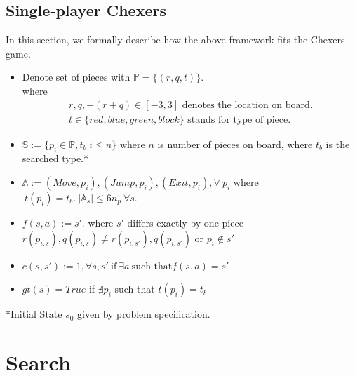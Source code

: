 \documentclass[10.5pt,a4paper]{article}
\begin{document}
    \subsection{Single-player Chexers}
    In this section, we formally describe how the above framework fits the Chexers game.
    \begin{itemize}
        \itemsep0em
        \item Denote set of pieces with $\mathbb{P}=\{(r, q, t)\}$. \\
        where
        \begin{align*}
            \text{$r, q, -(r+q)\in [-3, 3]$ denotes the location on board.}\\
            \text{$t\in \{red, blue, green, block\}$ stands for type of piece.}    
        \end{align*}
        
        \item $\mathbb{S} := \{p_i\in \mathbb{P}, t_b|i\le n\}$ where $n$ is number of pieces on board, where $t_b$ is the searched type.*
        \item $\mathbb{A} := (Move,p_i), (Jump, p_i), (Exit, p_i), \forall\ p_i $ where$\ t(p_i)=t_b.\ | \mathbb{A}_s| \le 6n_p\ \forall s$.
        \item $f(s, a) := s'$. where $s'$ differs exactly by one piece $r(p_{i,s}), q(p_{i,s}) \ne r(p_{i,s'}), q(p_{i,s'})$ or $p_i\notin s'$
        \item $c(s, s') := 1, \forall s, s'\ \text{if}\ \exists a\ \text{such that} f(s, a) = s'$
        \item $gt(s) = True$ if $\nexists p_i$ such that $t(p_i) = t_b$
    \end{itemize}
    \vspace{-5pt}
    *Initial State $s_0$ given by problem specification.
    \vspace{-5pt}
    \section{Search}
\end{document}
